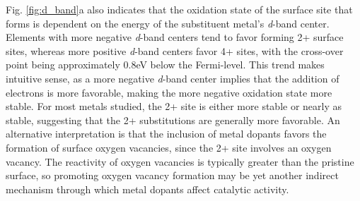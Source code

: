 Fig. \ref{fig:d_band}a also indicates that the oxidation state of the surface site that forms is dependent on the energy of the substituent metal's \textit{d}-band center. Elements with more negative \textit{d}-band centers tend to favor forming 2+ surface sites, whereas more positive \textit{d}-band centers favor 4+ sites, with the cross-over point being approximately 0.8eV below the Fermi-level. This trend makes intuitive sense, as a more negative \textit{d}-band center implies that the addition of electrons is more favorable, making the more negative oxidation state more stable. For most metals studied, the 2+ site is either more stable or nearly as stable, suggesting that the 2+ substitutions are generally more favorable. An alternative interpretation is that the inclusion of metal dopants favors the formation of surface oxygen vacancies, since the 2+ site involves an oxygen vacancy. The reactivity of oxygen vacancies is typically greater than the pristine surface, so promoting oxygen vacancy formation may be yet another indirect mechanism through which metal dopants affect catalytic activity.




